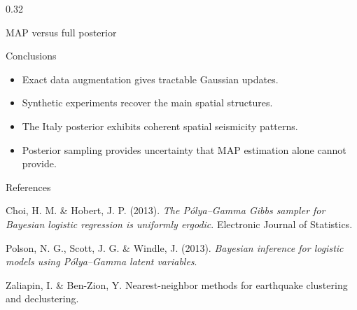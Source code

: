 \documentclass[final]{beamer}
\begin{document}
\begin{frame}[t]
\begin{columns}[t,totalwidth=\textwidth]
\begin{column}{0.32\textwidth}
\begin{block}{MAP versus full posterior}
\end{block}


\begin{block}{Conclusions}


\begin{itemize}
    \item Exact data augmentation gives tractable Gaussian updates.
    \item Synthetic experiments recover the main spatial structures.
    \item The Italy posterior exhibits coherent spatial seismicity patterns.
    \item Posterior sampling provides uncertainty that MAP estimation alone cannot provide.
\end{itemize}

\end{block}

\begin{block}{References}

\footnotesize

Choi, H. M. \& Hobert, J. P. (2013).
\textit{The Pólya--Gamma Gibbs sampler for Bayesian logistic regression
is uniformly ergodic}.
Electronic Journal of Statistics.

\vspace{0.15cm}

Polson, N. G., Scott, J. G. \& Windle, J. (2013).
\textit{Bayesian inference for logistic models using Pólya--Gamma latent variables}.

\vspace{0.15cm}

Zaliapin, I. \& Ben-Zion, Y.
Nearest-neighbor methods for earthquake clustering and declustering.

\end{block}

\end{column}

\end{columns}

\end{frame}
\end{document}
